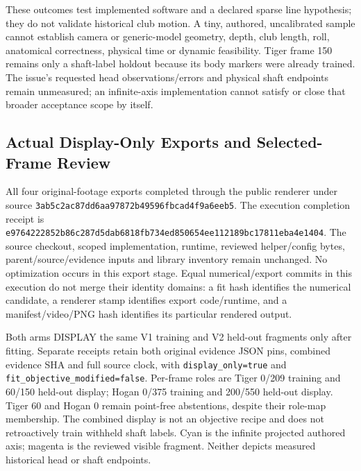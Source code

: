 \documentclass[11pt,letterpaper]{article}
\newcommand{\code}[1]{\nolinkurl{#1}}
\newcommand{\hash}[1]{{\footnotesize\nolinkurl{#1}}}
\begin{document}
These outcomes test implemented software and a declared sparse line hypothesis;
they do not validate historical club motion. A tiny, authored, uncalibrated
sample cannot establish camera or generic-model geometry, depth, club length,
roll, anatomical correctness, physical time or dynamic feasibility. Tiger frame
150 remains only a shaft-label holdout because its body markers were already
trained. The issue's requested head observations/errors and physical shaft
endpoints remain unmeasured; an infinite-axis implementation cannot satisfy or
close that broader acceptance scope by itself.

\subsection{Actual Display-Only Exports and Selected-Frame Review}
All four original-footage exports completed through the public renderer under
source \code{3ab5c2ac87dd6aa97872b49596fbcad4f9a6eeb5}. The execution completion
receipt is \hash{e9764222852b86c287d5dab6818fb734ed850654ee112189bc17811eba4e1404}.
The source checkout, scoped implementation, runtime, reviewed helper/config
bytes, parent/source/evidence inputs and library inventory remain unchanged.
No optimization occurs in this export stage. Equal numerical/export commits
in this execution do not merge their identity domains: a fit hash identifies
the numerical candidate, a renderer stamp identifies export code/runtime,
and a manifest/video/PNG hash identifies its particular rendered output.

Both arms DISPLAY the same V1 training and V2 held-out fragments only after
fitting. Separate receipts retain both original evidence JSON pins, combined
evidence SHA and full source clock, with \code{display_only=true} and
\code{fit_objective_modified=false}. Per-frame roles are Tiger 0/209 training
and 60/150 held-out display; Hogan 0/375 training and 200/550 held-out display.
Tiger 60 and Hogan 0 remain point-free abstentions, despite their role-map
membership. The combined display is not an objective recipe and does not
retroactively train withheld shaft labels. Cyan is the infinite projected
authored axis; magenta is the reviewed visible fragment. Neither depicts
measured historical head or shaft endpoints.
\end{document}
